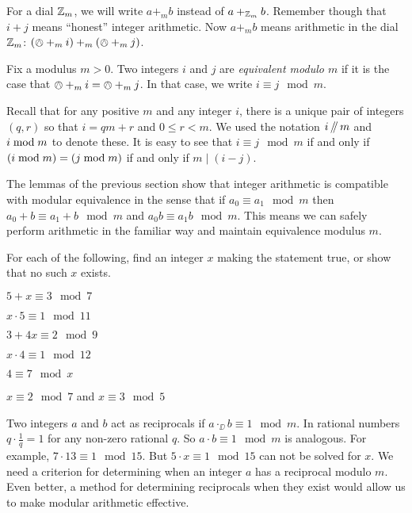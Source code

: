 For a dial ${\mathbb Z}_m$, we will write $a +_m b$ instead of $a +_{{\mathbb Z}_m} b$. Remember though that $i+j$ means ``honest'' integer arithmetic. Now $a +_m b$ means arithmetic in the dial ${\mathbb Z}_m$: $(\owedge +_m i)+_m(\owedge +_m j)$. 

\begin{defn}\label{def:modulus}
	Fix a modulus $m>0$. Two integers $i$ and $j$ are \emph{equivalent modulo $m$} if it is the case that $\owedge +_m i = \owedge +_m j$. In that case, we write $i\equiv j\mod m$. 
\end{defn}

Recall that for any positive $m$ and any integer $i$, there is a unique pair of integers $(q,r)$ so that $i = qm + r$ and $0\leq r < m$. We used the notation $i\mathop{/\mkern-5mu/} m$ and $i\bmod m$ to denote these. It is easy to see that
$i \equiv j \mod m$ if and only if $(i\bmod m)=(j\bmod m)$ if and only if $m\mid (i-j)$.

The lemmas of the previous section show that integer arithmetic is compatible with modular equivalence in the sense that if $a_0\equiv a_1\mod m$ then $a_0 + b \equiv a_1 + b\mod m$ and $a_0b\equiv a_1b\mod m$. This means we can safely perform arithmetic in the familiar way and maintain equivalence modulus $m$. 

\begin{exer}
	For each of the following, find an integer $x$ making the statement true, or show that no such $x$ exists.
	\begin{exercise}
		\item $5 + x \equiv 3 \mod 7$
		\item $x\cdot 5\equiv 1 \mod 11$
		\item $3 + 4x \equiv 2\mod 9$
		\item $x\cdot 4 \equiv 1\mod 12$
		\item $4 \equiv 7 \mod x$
		\item $x\equiv 2\mod 7$ and $x\equiv 3\mod 5$
	\end{exercise}
\end{exer}

Two integers $a$ and $b$ act as reciprocals if $a \cdot_\DD b\equiv 1\mod m$.
In rational numbers $q\cdot \frac1q = 1$ for any non-zero rational $q$. So $a\cdot b\equiv 1\mod m$ is analogous. For example, $7\cdot 13 \equiv 1\mod 15$. But $5\cdot x \equiv 1\mod 15$ can not be solved for $x$. We need a criterion for determining when an integer $a$ has a reciprocal modulo $m$. Even better, a method for determining reciprocals when they exist would allow us to make modular arithmetic effective. 

